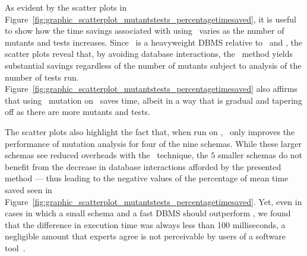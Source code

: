 

 As evident by the scatter plots in Figure~\ref{fig:graphic_scatterplot_mutantstests_percentagetimesaved}, it is useful to show how the time savings associated with using \virtualmutationanalysis~varies as the number of mutants and tests increases. Since \postgres~is a heavyweight DBMS relative to \HyperSQL~and \sqlite, the scatter plots reveal that, by avoiding database interactions, the \virtual~method yields substantial savings regardless of the number of mutants subject to analysis of the number of tests run.  Figure~\ref{fig:graphic_scatterplot_mutantstests_percentagetimesaved} also affirms that using \virtual~mutation on \HyperSQL~saves time, albeit in a way that is gradual and tapering off as there are more mutants and tests.


The scatter plots also highlight the fact that, when run on \sqlite, \virtual~only improves the performance of mutation analysis for four of the nine schemas. While these larger schemas see reduced overheads with the \virtual~technique, the $5$ smaller schemas do not benefit from the decrease in database interactions afforded by the presented method --- thus leading to the negative values of the percentage of mean time saved seen in Figure~\ref{fig:graphic_scatterplot_mutantstests_percentagetimesaved}. Yet, even in cases in which a small schema and a fast DBMS should outperform \vma, we found that the difference in execution time was always less than 100 milliseconds, a negligible amount that experts agree is not perceivable by users of a software tool~\cite{Neumann2015}.


